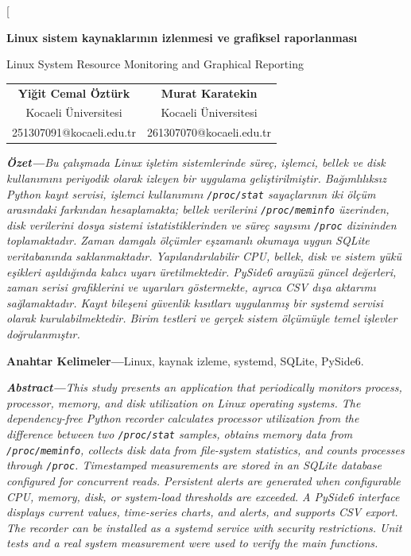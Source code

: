 \documentclass[9pt,a4paper,twocolumn]{extarticle}
\newcommand{\keywordname}{\textbf{Anahtar Kelimeler---}}
\begin{document}
\shorthandoff{=}

\twocolumn[
\vspace*{5mm}
\begin{center}
{\Large\bfseries Linux sistem kaynaklarının izlenmesi ve grafiksel raporlanması\par}
\vspace{4pt}
{\large Linux System Resource Monitoring and Graphical Reporting\par}
\vspace{8pt}
\begin{tabular}{cc}
\textbf{Yiğit Cemal Öztürk} &
\textbf{Murat Karatekin} \\

Kocaeli Üniversitesi &
Kocaeli Üniversitesi \\

251307091@kocaeli.edu.tr &
261307070@kocaeli.edu.tr
\end{tabular}
\end{center}
\vspace{8pt}

\noindent\textit{\textbf{Özet---}Bu çalışmada Linux işletim sistemlerinde süreç, işlemci, bellek ve disk kullanımını periyodik olarak izleyen bir uygulama geliştirilmiştir. Bağımlılıksız Python kayıt servisi, işlemci kullanımını \texttt{/proc/stat} sayaçlarının iki ölçüm arasındaki farkından hesaplamakta; bellek verilerini \texttt{/proc/meminfo} üzerinden, disk verilerini dosya sistemi istatistiklerinden ve süreç sayısını \texttt{/proc} dizininden toplamaktadır. Zaman damgalı ölçümler eşzamanlı okumaya uygun SQLite veritabanında saklanmaktadır. Yapılandırılabilir CPU, bellek, disk ve sistem yükü eşikleri aşıldığında kalıcı uyarı üretilmektedir. PySide6 arayüzü güncel değerleri, zaman serisi grafiklerini ve uyarıları göstermekte, ayrıca CSV dışa aktarımı sağlamaktadır. Kayıt bileşeni güvenlik kısıtları uygulanmış bir systemd servisi olarak kurulabilmektedir. Birim testleri ve gerçek sistem ölçümüyle temel işlevler doğrulanmıştır.}

\vspace{4pt}
\noindent\keywordname Linux, kaynak izleme, systemd, SQLite, PySide6.

\vspace{12mm}
\noindent\textit{\textbf{Abstract---}This study presents an application that periodically monitors process, processor, memory, and disk utilization on Linux operating systems. The dependency-free Python recorder calculates processor utilization from the difference between two \texttt{/proc/stat} samples, obtains memory data from \texttt{/proc/meminfo}, collects disk data from file-system statistics, and counts processes through \texttt{/proc}. Timestamped measurements are stored in an SQLite database configured for concurrent reads. Persistent alerts are generated when configurable CPU, memory, disk, or system-load thresholds are exceeded. A PySide6 interface displays current values, time-series charts, and alerts, and supports CSV export. The recorder can be installed as a systemd service with security restrictions. Unit tests and a real system measurement were used to verify the main functions.}
\end{document}
